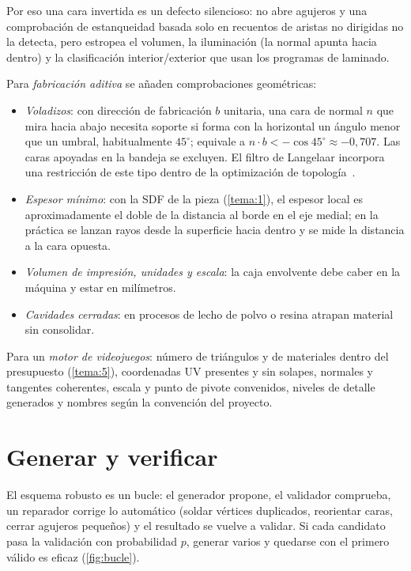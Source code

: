 Por eso una cara invertida es un defecto silencioso: no abre agujeros y una comprobación de estanqueidad basada solo en recuentos de aristas no dirigidas no la detecta, pero estropea el volumen, la iluminación (la normal apunta hacia dentro) y la clasificación interior/exterior que usan los programas de laminado.

Para \emph{fabricación aditiva} se añaden comprobaciones geométricas:
\begin{itemize}[leftmargin=1.4em]
  \item \emph{Voladizos}: con dirección de fabricación $b$ unitaria, una cara de normal $n$ que mira hacia abajo necesita soporte si forma con la horizontal un ángulo menor que un umbral, habitualmente $45^\circ$; equivale a $n\cdot b<-\cos 45^\circ\approx-0{,}707$. Las caras apoyadas en la bandeja se excluyen. El filtro de Langelaar incorpora una restricción de este tipo dentro de la optimización de topología~\cite{langelaar}.
  \item \emph{Espesor mínimo}: con la SDF de la pieza (\cref{tema:1}), el espesor local es aproximadamente el doble de la distancia al borde en el eje medial; en la práctica se lanzan rayos desde la superficie hacia dentro y se mide la distancia a la cara opuesta.
  \item \emph{Volumen de impresión, unidades y escala}: la caja envolvente debe caber en la máquina y estar en milímetros.
  \item \emph{Cavidades cerradas}: en procesos de lecho de polvo o resina atrapan material sin consolidar.
\end{itemize}
Para un \emph{motor de videojuegos}: número de triángulos y de materiales dentro del presupuesto (\cref{tema:5}), coordenadas UV presentes y sin solapes, normales y tangentes coherentes, escala y punto de pivote convenidos, niveles de detalle generados y nombres según la convención del proyecto.

\section{Generar y verificar}

El esquema robusto es un bucle: el generador propone, el validador comprueba, un reparador corrige lo automático (soldar vértices duplicados, reorientar caras, cerrar agujeros pequeños) y el resultado se vuelve a validar. Si cada candidato pasa la validación con probabilidad $p$, generar varios y quedarse con el primero válido es eficaz (\cref{fig:bucle}).

